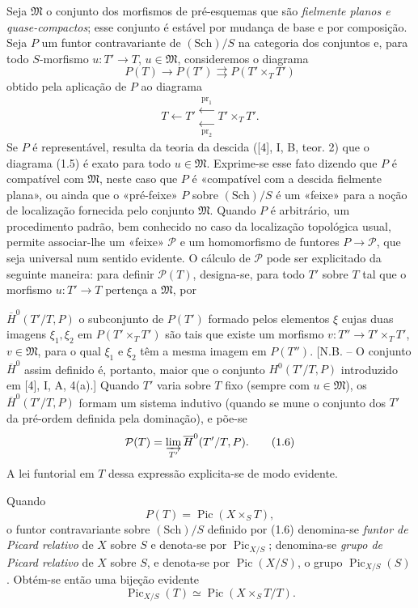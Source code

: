 \documentclass[11pt,twoside,openany]{book}
\numberwithin{equation}{section}
\newcommand{\src}[1]{%
  \phantomsection\hypertarget{src:#1}{}%
  \marginpar{\raggedleft\footnotesize\sffamily #1}%
}
\theoremstyle{plain}
\theoremstyle{definition}
\theoremstyle{remark}
\newcommand{\FgaUnitKey}{frontmatter}
\renewcommand{\src}[1]{%
  \phantomsection\hypertarget{src:\FgaUnitKey:#1}{}%
  \marginpar{\raggedleft\footnotesize\sffamily #1}%
}
\begin{document}
Seja $\mathfrak M$ o conjunto dos morfismos de pré-esquemas que são
\emph{fielmente planos e quase-compactos}; esse conjunto é estável por mudança
de base e por composição. Seja $P$ um funtor contravariante de
$(\mathrm{Sch})/S$ na categoria dos conjuntos e, para todo $S$-morfismo
$u:T'\longrightarrow T$, $u\in\mathfrak M$, consideremos o diagrama
\begin{equation}
P(T)\longrightarrow P(T')\rightrightarrows P(T'\times_TT')
\tag{1.5}
\end{equation}
obtido pela aplicação de $P$ ao diagrama
\[
T\longleftarrow T'\mathrel{\substack{\xleftarrow{\,\mathrm{pr}_1\,}\\[-0.35ex]
\xleftarrow[\,\mathrm{pr}_2\,]{}}}T'\times_TT'.
\]
Se $P$ é representável, resulta da teoria da descida ([4], I, B, teor. 2) que
o diagrama (1.5) é exato para todo $u\in\mathfrak M$. Exprime-se esse fato
dizendo que $P$ é compatível com $\mathfrak M$, neste caso que $P$ é
«compatível com a descida fielmente plana», ou ainda que o «pré-feixe» $P$
sobre $(\mathrm{Sch})/S$ é um «feixe» para a noção de localização fornecida
pelo conjunto $\mathfrak M$. Quando $P$ é arbitrário, um procedimento padrão,
bem conhecido no caso da localização topológica usual, permite associar-lhe
um «feixe» $\mathcal P$ e um homomorfismo de funtores
$P\longrightarrow\mathcal P$, que seja universal num sentido evidente. O
cálculo de $\mathcal P$ pode ser explicitado da seguinte maneira: para definir
$\mathcal P(T)$, designa-se, para todo $T'$ sobre $T$ tal que o morfismo
$u:T'\longrightarrow T$ pertença a $\mathfrak M$, por
\src{145}
$\overline H^0(T'/T,P)$ o subconjunto de $P(T')$ formado pelos elementos $\xi$
cujas duas imagens $\xi_1,\xi_2$ em $P(T'\times_TT')$ são tais que existe um
morfismo $v:T''\longrightarrow T'\times_TT'$, $v\in\mathfrak M$, para o qual
$\xi_1$ e $\xi_2$ têm a mesma imagem em $P(T'')$. [N.B. -- O conjunto
$\overline H^0$ assim definido é, portanto, maior que o conjunto
$H^0(T'/T,P)$ introduzido em [4], I, A, 4(a).] Quando $T'$ varia sobre $T$
fixo (sempre com $u\in\mathfrak M$), os $\overline H^0(T'/T,P)$ formam um
sistema indutivo (quando se mune o conjunto dos $T'$ da pré-ordem definida pela
dominação), e põe-se
\begin{equation}
\mathcal P(T)=\varinjlim_{T'}\overline H^0(T'/T,P).
\tag{1.6}
\end{equation}
A lei funtorial em $T$ dessa expressão explicita-se de modo evidente.

Quando
\[
P(T)=\operatorname{Pic}(X\times_ST),
\]
o funtor contravariante sobre $(\mathrm{Sch})/S$ definido por (1.6) denomina-se
\emph{funtor de Picard relativo} de $X$ sobre $S$ e denota-se por
$\operatorname{Pic}_{X/S}$; denomina-se \emph{grupo de Picard relativo} de
$X$ sobre $S$, e denota-se por $\operatorname{Pic}(X/S)$, o grupo
$\operatorname{Pic}_{X/S}(S)$. Obtém-se então uma bijeção evidente
\begin{equation}
\operatorname{Pic}_{X/S}(T)\simeq\operatorname{Pic}(X\times_ST/T).
\tag{1.7}
\end{equation}
\end{document}
